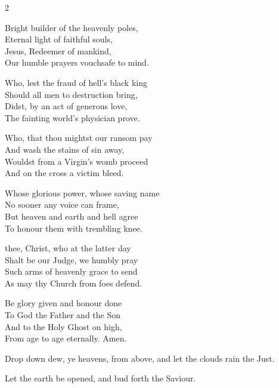 \documentclass[12pt]{book}
\begin{document}
\begin{multicols}{2}
\begin{enpars}

Bright builder of the heavenly poles,\\
Eternal light of faithful souls,\\
Jesus, Redeemer of mankind,\\
Our humble prayers vouchsafe to mind.

Who, lest the fraud of hell’s black king\\
Should all men to destruction bring,\\
Didst, by an act of generous love,\\
The fainting world’s physician prove.

Who, that thou mightst our ransom pay\\
And wash the stains of sin away,\\
Wouldst from a Virgin’s womb proceed\\
And on the cross a victim bleed.

Whose glorious power, whose saving name\\
No sooner any voice can frame,\\
But heaven and earth and hell agree\\
To honour them with trembling knee.

thee, Christ, who at the latter day\\
Shalt be our Judge, we humbly pray\\
Such arms of heavenly grace to send\\
As may thy Church from foes defend.

Be glory given and honour done\\
To God the Father and the Son\\
And to the Holy Ghost on high,\\
From age to age eternally. Amen.
\end{enpars}
\end{multicols}


\begin{enpars} \noindent \vv Drop down dew, ye heavens, from above, and let the clouds rain the Just.

\noindent \rr Let the earth be opened, and bud forth the Saviour.
 \end{enpars}
 
\end{document}
